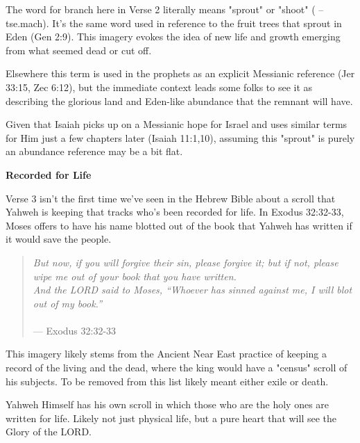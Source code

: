 \documentclass[11pt]{article}
\begin{document}
The word for branch here in Verse 2 literally means "sprout" or "shoot" ( – tse.mach). It's the same word used in reference
to the fruit trees that sprout in Eden (Gen 2:9). This imagery evokes the idea of new life and growth emerging from what seemed dead or cut off.
\vspace{1em}

Elsewhere this term is used in the prophets as an explicit Messianic reference (Jer 33:15, Zec 6:12), but the immediate context leads some folks to see it as describing the glorious land and Eden-like abundance that the remnant will have.
\vspace{1em}

Given that Isaiah picks up on a Messianic hope for Israel and uses similar terms for Him just a few chapters later (Isaiah 11:1,10), assuming this "sprout" is purely an abundance reference may be a bit flat.


\vspace{3em}
{\large\bfseries Recorded for Life}
\vspace{1em}

Verse 3 isn't the first time we've seen in the Hebrew Bible about a scroll that Yahweh is keeping that tracks who's been recorded for life.
In Exodus 32:32-33, Moses offers to have his name blotted out of the book that Yahweh has written if it would save the people.

\begin{quote}
\textit{But now, if you will forgive their sin, please forgive it; but if not, please wipe me out of your book that you have written.
\\And the LORD said to Moses, “Whoever has sinned against me, I will blot out of my book.”}\\\\
\hfill --- Exodus 32:32-33
\end{quote}

{\vspace{1em}}

This imagery likely stems from the Ancient Near East practice of keeping a record of the living and the dead, where the king would have a "census" scroll of his subjects. To be removed from this list likely meant either exile or death.

{\vspace{1em}}

Yahweh Himself has his own scroll in which those who are the holy ones are written for life. Likely not just physical life, but a pure heart that will see the Glory of the LORD.
\end{document}

